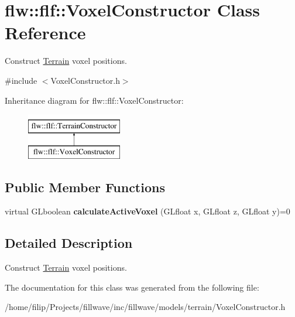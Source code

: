\hypertarget{classflw_1_1flf_1_1VoxelConstructor}{}\section{flw\+:\+:flf\+:\+:Voxel\+Constructor Class Reference}
\label{classflw_1_1flf_1_1VoxelConstructor}


Construct \hyperlink{classflw_1_1flf_1_1Terrain}{Terrain} voxel positions.  




{\ttfamily \#include $<$Voxel\+Constructor.\+h$>$}

Inheritance diagram for flw\+:\+:flf\+:\+:Voxel\+Constructor\+:\begin{figure}[H]
\begin{center}
\leavevmode
\includegraphics[height=2.000000cm]{classflw_1_1flf_1_1VoxelConstructor}
\end{center}
\end{figure}
\subsection*{Public Member Functions}
\begin{DoxyCompactItemize}
\item 
virtual G\+Lboolean {\bfseries calculate\+Active\+Voxel} (G\+Lfloat x, G\+Lfloat z, G\+Lfloat y)=0\hypertarget{classflw_1_1flf_1_1VoxelConstructor_a98015c342b6d5aa6ebf810798c57a365}{}\label{classflw_1_1flf_1_1VoxelConstructor_a98015c342b6d5aa6ebf810798c57a365}

\end{DoxyCompactItemize}


\subsection{Detailed Description}
Construct \hyperlink{classflw_1_1flf_1_1Terrain}{Terrain} voxel positions. 

The documentation for this class was generated from the following file\+:\begin{DoxyCompactItemize}
\item 
/home/filip/\+Projects/fillwave/inc/fillwave/models/terrain/Voxel\+Constructor.\+h\end{DoxyCompactItemize}
